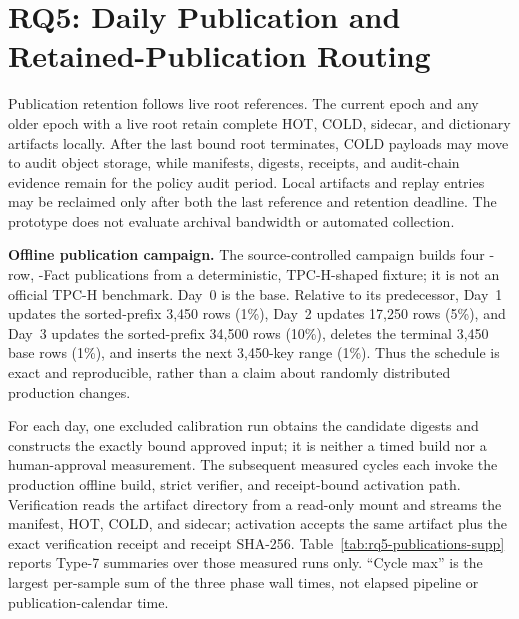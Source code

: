 \documentclass[journal,onecolumn]{IEEEtran}
\begin{document}
\section{RQ5: Daily Publication and Retained-Publication Routing}
\label{sec:rq5-supp}

Publication retention follows live root references. The current epoch and any
older epoch with a live root retain complete HOT, COLD, sidecar, and dictionary
artifacts locally. After the last bound root terminates, COLD payloads may move
to audit object storage, while manifests, digests, receipts, and audit-chain
evidence remain for the policy audit period. Local artifacts and replay entries
may be reclaimed only after both the last reference and retention deadline.
The prototype does not evaluate archival bandwidth or automated collection.

\textbf{Offline publication campaign.}
The source-controlled campaign builds four \RQFiveRows-row,
\RQFiveFacts-Fact publications from a deterministic, TPC-H-shaped fixture; it
is not an official TPC-H benchmark. Day~0 is the base. Relative to its
predecessor, Day~1 updates the sorted-prefix 3,450 rows (1\%), Day~2 updates
17,250 rows (5\%), and Day~3 updates the sorted-prefix 34,500 rows (10\%),
deletes the terminal 3,450 base rows (1\%), and inserts the next 3,450-key range
(1\%). Thus the schedule is exact and reproducible, rather than a claim about
randomly distributed production changes.

For each day, one excluded calibration run obtains the candidate digests and
constructs the exactly bound approved input; it is neither a timed build nor a
human-approval measurement. The subsequent \RQFiveBuildRunsPerDay{} measured
cycles each invoke the production offline build, strict verifier, and
receipt-bound activation path. Verification reads the artifact directory from
a read-only mount and streams the manifest, HOT, COLD, and sidecar; activation
accepts the same artifact plus the exact verification receipt and receipt
SHA-256. Table~\ref{tab:rq5-publications-supp} reports Type-7 summaries over
those measured runs only. ``Cycle max'' is the largest per-sample sum of the
three phase wall times, not elapsed pipeline or publication-calendar time.
\end{document}
